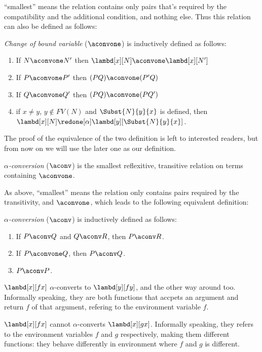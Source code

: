 \documentclass[../../../include/open-logic-section]{subfiles}
\begin{document}
``smallest'' means the relation contains only pairs that's required by
the compatibility and the additional condition, and nothing else. Thus
this relation can also be defined as follows:
\begin{defn} 
  \emph{Change of bound variable} ($\aconvone$) is inductively
  defined as follows:
  \begin{enumerate}
  \item If $N \aconvone N'$ then $\lambd[x][N] \aconvone
    \lambd[x][N']$ 
  \item If $P \aconvone P'$ then $(PQ) \aconvone (P'Q)$ 
  \item If $Q \aconvone Q'$ then $(PQ) \aconvone (PQ')$ 
  \item if $x \neq y$, $y \notin FV(N)$ and $\Subst{N}{y}{x}$ is defined, then
    $\lambd[x][N] \redone[\alpha] \lambd[y][\Subst{N}{y}{x}]$.
    
  \end{enumerate}
\end{defn}

The proof of the equivalence of the two definition is left to
interested readers, but from now on we will use the later one as our
definition.

\begin{defn}
  \emph{$\alpha$-conversion} ($\aconv$) is the smallest reflexitive, transitive relation on terms containing $\aconvone$.
\end{defn}

As above, ``smallest'' means the relation only contains pairs required
by the transitivity, and $\aconvone$, which leads to the following equivalent definition:
\begin{defn}
  \emph{$\alpha$-conversion} ($\aconv$) is inductively defined as follows:
  \begin{enumerate}
  \item If $P \aconv Q$ and $Q \aconv R$, then $P \aconv R$.
  \item If $P \aconvone Q$, then $P \aconv Q$. 
  \item $P \aconv P$. 
  \end{enumerate}
\end{defn}

\begin{ex}
  $\lambd[x][f x]$ $\alpha$-converts to $\lambd[y][f
  y]$, and the other way around too. Informally
  speaking, they are both functions that accpets an argument and
  return $f$ of that argument, refering to the environment variable $f$.
\end{ex}
\begin{ex}
  $\lambd[x][f x]$ cannot $\alpha$-converts $\lambd[x][g
  x]$. Informally speaking, they refers to the environment variables $f$ and $g$ respectively,
  making them different functions: they behave differently in
  environment where $f$ and $g$ is different.
\end{ex}
\end{document}
